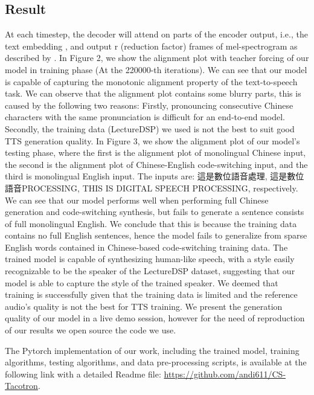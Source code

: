 \documentclass{article} %
\begin{document}
\begin{CJK}{UTF8}{bsmi}
\section{Result}
At each timestep, the decoder will attend on parts of the encoder output, i.e., the text embedding , and output r (reduction factor) frames of mel-spectrogram as described by \citet{Wang2017}. In Figure 2, we show the alignment plot with teacher forcing of our model in training phase (At the 220000-th iterations). We can see that our model is capable of capturing the monotonic alignment property of the text-to-speech task. We can observe that the alignment plot contains some blurry parts, this is caused by the following two reasons: Firstly, pronouncing consecutive Chinese characters with the same pronunciation is difficult for an end-to-end model. Secondly, the training data (LectureDSP) we used is not the best to suit good TTS generation quality.  In Figure 3, we show the alignment plot of our model's testing phase, where the first is the alignment plot of monolingual Chinese input, the second is the alignment plot of Chinese-English code-switching input, and the third is monolingual English input. The inputs are: 這是數位語音處理, 這是數位語音PROCESSING, THIS IS DIGITAL SPEECH PROCESSING, respectively. We can see that our model performs well when performing full Chinese generation and code-switching synthesis, but fails to generate a sentence consists of full monolingual English. We conclude that this is because the training data contains no full English sentences, hence the model fails to generalize from sparse English words contained in Chinese-based code-switching training data. The trained model is capable of synthesizing human-like speech, with a style easily recognizable to be the speaker of the LectureDSP dataset, suggesting that our model is able to capture the style of the trained speaker. We deemed that training is successfully given that the training data is limited and the reference audio's quality  is not the best for TTS training. We present the generation quality of our model in a live demo session, however for the need of reproduction of our results we open source the code we use.

The Pytorch implementation of our work, including the trained model, training algorithms, testing algorithms, and data pre-processing scripts, is available at the following link with a detailed Readme file: \url{https://github.com/andi611/CS-Tacotron}.


\end{CJK}
\end{document}
